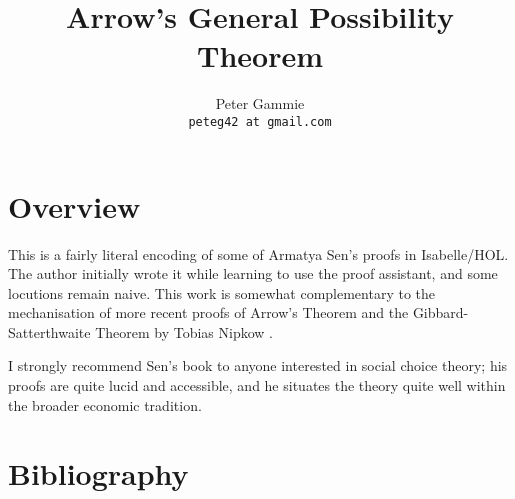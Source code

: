 \documentclass[11pt,a4paper]{article}
\begin{document}
\title{Arrow's General Possibility Theorem}
\author{Peter Gammie\\
  \texttt{peteg42 at gmail.com}
}
\maketitle

\tableofcontents

\section{Overview}

This is a fairly literal encoding of some of Armatya Sen's proofs
\cite{Sen:70a} in Isabelle/HOL. The author initially wrote it while learning
to use the proof assistant, and some locutions remain naive. This work is
somewhat complementary to the mechanisation of more recent proofs of Arrow's
Theorem and the Gibbard-Satterthwaite Theorem by Tobias Nipkow
\cite{Nipkow:2008}.

I strongly recommend Sen's book to anyone interested in social choice
theory; his proofs are quite lucid and accessible, and he situates the
theory quite well within the broader economic tradition.



\section{Bibliography}



\end{document}
